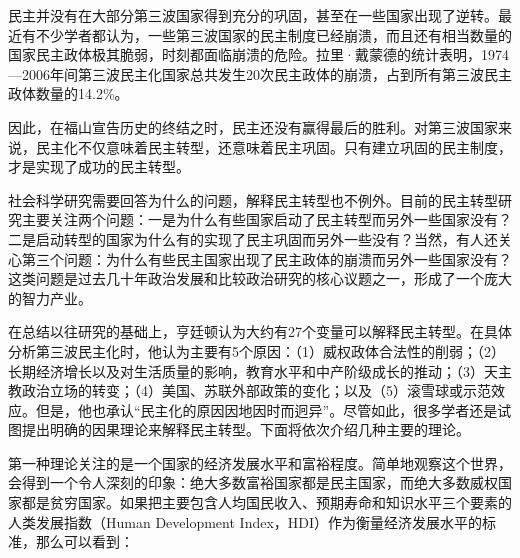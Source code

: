 
民主并没有在大部分第三波国家得到充分的巩固，甚至在一些国家出现了逆转。最近有不少学者都认为，一些第三波国家的民主制度已经崩溃，而且还有相当数量的国家民主政体极其脆弱，时刻都面临崩溃的危险。拉里·戴蒙德的统计表明，1974—2006年间第三波民主化国家总共发生20次民主政体的崩溃，占到所有第三波民主政体数量的14.2\%。

因此，在福山宣告历史的终结之时，民主还没有赢得最后的胜利。对第三波国家来说，民主化不仅意味着民主转型，还意味着民主巩固。只有建立巩固的民主制度，才是实现了成功的民主转型。


社会科学研究需要回答为什么的问题，解释民主转型也不例外。目前的民主转型研究主要关注两个问题：一是为什么有些国家启动了民主转型而另外一些国家没有？二是启动转型的国家为什么有的实现了民主巩固而另外一些没有？当然，有人还关心第三个问题：为什么有些民主国家出现了民主政体的崩溃而另外一些国家没有？这类问题是过去几十年政治发展和比较政治研究的核心议题之一，形成了一个庞大的智力产业。

在总结以往研究的基础上，亨廷顿认为大约有27个变量可以解释民主转型。在具体分析第三波民主化时，他认为主要有5个原因：（1）威权政体合法性的削弱；（2）长期经济增长以及对生活质量的影响，教育水平和中产阶级成长的推动；（3）天主教政治立场的转变；（4）美国、苏联外部政策的变化；以及（5）滚雪球或示范效应。但是，他也承认“民主化的原因因地因时而迥异”。尽管如此，很多学者还是试图提出明确的因果理论来解释民主转型。下面将依次介绍几种主要的理论。

第一种理论关注的是一个国家的经济发展水平和富裕程度。简单地观察这个世界，会得到一个令人深刻的印象：绝大多数富裕国家都是民主国家，而绝大多数威权国家都是贫穷国家。如果把主要包含人均国民收入、预期寿命和知识水平三个要素的人类发展指数（Human Development Index，HDI）作为衡量经济发展水平的标准，那么可以看到：


